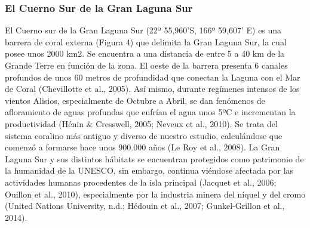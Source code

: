 \documentclass[a4paper, 11pt]{article}
\begin{document}
\subsubsection{El Cuerno Sur de la Gran Laguna Sur}
El Cuerno sur de la Gran Laguna Sur (22º 55,960’S, 166º 59,607’ E) es una barrera de coral externa (Figura 4) que delimita la Gran Laguna Sur, la cual posee unos 2000 km2. Se encuentra a una distancia de entre 5 a 40 km de la Grande Terre en función de la zona. El oeste de la barrera presenta 6 canales profundos de unos 60 metros de profundidad que conectan la Laguna con el Mar de Coral (Chevillotte et al., 2005). Así mismo, durante regímenes intensos de los vientos Alisios, especialmente de Octubre a Abril, se dan fenómenos de afloramiento de aguas profundas que enfrían el agua unos 5ºC e incrementan la productividad (Hénin & Cresswell, 2005; Neveux et al., 2010). Se trata del sistema coralino más antiguo y diverso de nuestro estudio, calculándose que comenzó a formarse hace unos 900.000 años (Le Roy et al., 2008). La Gran Laguna Sur y sus distintos hábitats se encuentran protegidos como patrimonio de la humanidad de la UNESCO, sin embargo, continua viéndose afectada por las actividades humanas procedentes de la isla principal (Jacquet et al., 2006; Ouillon et al., 2010), especialmente por la industria minera del níquel y del cromo (United Nations University, n.d.; Hédouin et al., 2007; Gunkel-Grillon et al., 2014). 
\end{document}
